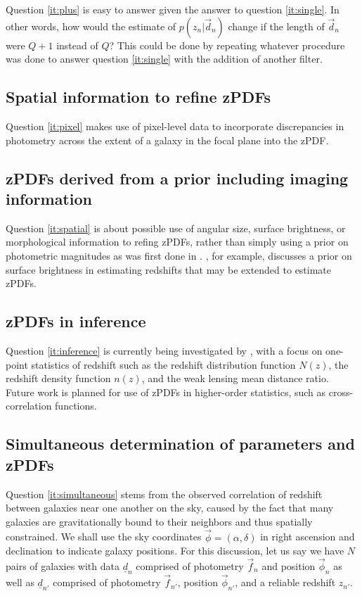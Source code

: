 \documentclass[12pt, onecolumn]{emulateapj}
\newcommand{\textul}{\underline}
\begin{document}
Question \ref{it:plus} is easy to answer given the answer to question \ref{it:single}.  In other words, how would the estimate of $p(z_{n}|\vec{d}_{n})$ change if the length of $\vec{d}_{n}$ were $Q+1$ instead of $Q$?  This could be done by repeating whatever procedure was done to answer question \ref{it:single} with the addition of another filter.

\subsection{Spatial information to refine zPDFs}

Question \ref{it:pixel} makes use of pixel-level data to incorporate discrepancies in photometry across the extent of a galaxy in the focal plane into the zPDF.

\subsection{zPDFs derived from a prior including imaging information}

Question \ref{it:spatial} is about possible use of angular size, surface brightness, or morphological information to refing zPDFs, rather than simply using a prior on photometric magnitudes as was first done in \citet{ben00}.  \citet{sta07}, for example, discusses a prior on surface brightness in estimating redshifts that may be extended to estimate zPDFs.

\subsection{zPDFs in inference}

Question \ref{it:inference} is currently being investigated by \citet{mal15}, with a focus on one-point statistics of redshift such as the redshift distribution function $N(z)$, the redshift density function $n(z)$, and the weak lensing mean distance ratio.  Future work is planned for use of zPDFs in higher-order statistics, such as cross-correlation functions.  

\subsection{Simultaneous determination of parameters and zPDFs}

Question \ref{it:simultaneous} stems from the observed correlation of redshift between galaxies near one another on the sky, caused by the fact that many galaxies are gravitationally bound to their neighbors and thus spatially constrained.  We shall use the sky coordinates $\vec{\phi}=(\alpha,\delta)$ in right ascension and declination to indicate galaxy positions.  For this discussion, let us say we have $N$ pairs of galaxies with data $\textul{d}_{n}$ comprised of photometry $\vec{f}_{n}$ and position $\vec{\phi}_{n}$ as well as $\textul{d}_{n'}$ comprised of photometry $\vec{f}_{n'}$, position $\vec{\phi}_{n'}$, and a reliable redshift $z_{n'}$.  
\end{document}
